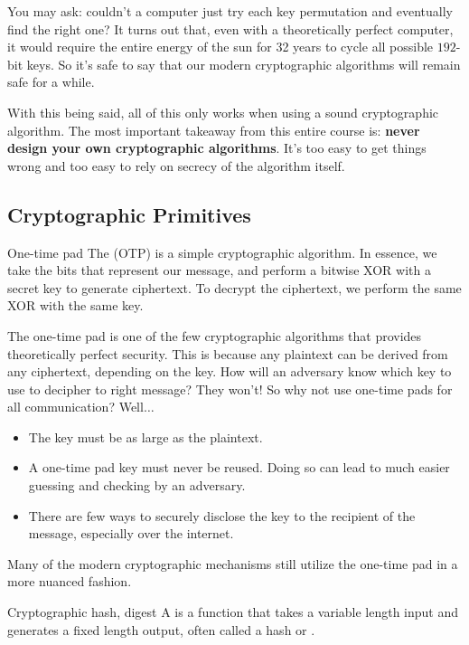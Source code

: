 You may ask: couldn't a computer just try each key permutation and eventually find the right one? It turns out that, even with a theoretically perfect computer, it would require the entire energy of the sun for 32 years to cycle all possible $192$-bit keys. So it's safe to say that our modern cryptographic algorithms will remain safe for a while.

With this being said, all of this only works when using a sound cryptographic algorithm. The most important takeaway from this entire course is: \textbf{never design your own cryptographic algorithms}. It's too easy to get things wrong and too easy to rely on secrecy of the algorithm itself.

\subsection{Cryptographic Primitives}
\begin{dfnbox}{One-time pad}{}
    The  (OTP) is a simple cryptographic algorithm. In essence, we take the bits that represent our message, and perform a bitwise XOR with a secret key to generate ciphertext. To decrypt the ciphertext, we perform the same XOR with the same key.
\end{dfnbox}

The one-time pad is one of the few cryptographic algorithms that provides theoretically perfect security. This is because any plaintext can be derived from any ciphertext, depending on the key. How will an adversary know which key to use to decipher to right message? They won't! So why not use one-time pads for all communication? Well$\ldots$

\begin{itemize}
    \item The key must be as large as the plaintext.
    \item A one-time pad key must never be reused. Doing so can lead to much easier guessing and checking by an adversary.
    \item There are few ways to securely disclose the key to the recipient of the message, especially over the internet.
\end{itemize}

Many of the modern cryptographic mechanisms still utilize the one-time pad in a more nuanced fashion.

\begin{dfnbox}{Cryptographic hash, digest}{}
    A  is a function that takes a variable length input and generates a fixed length output, often called a hash or .
\end{dfnbox}

